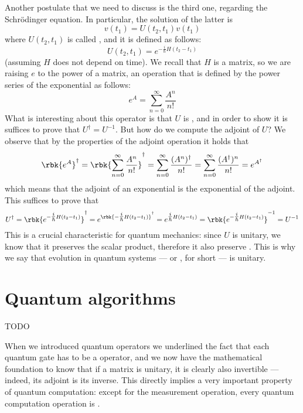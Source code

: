 \documentclass[a4paper, 12pt]{report}
\begin{document}
Another postulate that we need to discuss is the third one, regarding the Schrödinger equation. In particular, the solution of the latter is $$v(t_1) = U(t_2, t_1)v(t_1)$$ where $U(t_2, t_1)$ is called , and it is defined as follows: $$U(t_2, t_1) = e^{-\tfrac{i}{\hbar}H(t_2 - t_1)}$$ (assuming $H$ does not depend on time). We recall that $H$ is a matrix, so we are raising $e$ to the power of a matrix, an operation that is defined by the power series of the exponential as follows: $$e^A = \sum_{n = 0}^\infty{\dfrac{A^n}{n!}}$$ What is interesting about this operator is that $U$ is , and in order to show it is suffices to prove that $U^\dag = U^{-1}$. But how do we compute the adjoint of $U$? We observe that by the properties of the adjoint operation it holds that $$\rbk{e^A}^\dag = \rbk{\sum_{n = 0}^\infty{\dfrac{A^n}{n!}}}^\dag = \sum_{n = 0}^\infty{\dfrac{(A^n)^\dag}{n!}} = \sum_{n = 0}^\infty{\dfrac{(A^\dag)^n}{n!}} = e^{A^\dag}$$ which means that the adjoint of an exponential is the exponential of the adjoint. This suffices to prove that $$U^\dag = \rbk{e^{-\tfrac{i}{\hbar}H(t_2 - t_1)}}^\dag = e^{\rbk{-\tfrac{i}{\hbar}H(t_2 - t_1)}^\dag} = e^{\tfrac{i}{\hbar}H(t_2 - t_1)} = \rbk{e^{-\tfrac{i}{\hbar}H(t_2 - t_1)}}^{-1} = U^{-1}$$ This is a crucial characteristic for quantum mechanics: since $U$ is unitary, we know that it preserves the scalar product, therefore it also preserve . This is why we say that evolution in quantum systems --- or , for short --- is unitary.

\chapter{Quantum algorithms}

TODO 



When we introduced quantum operators we underlined the fact that each quantum gate has to be a  operator, and we now have the mathematical foundation to know that if a matrix is unitary, it is clearly also invertible --- indeed, its adjoint is its inverse. This directly implies a very important property of quantum computation: except for the measurement operation, every quantum computation operation is .
\end{document}
